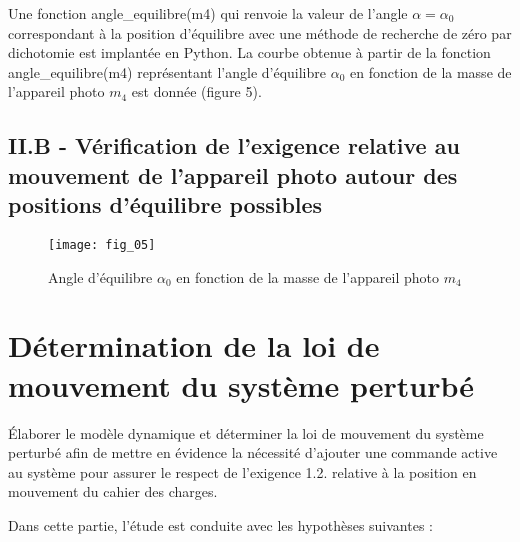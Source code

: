 Une fonction angle\_equilibre(m4) qui renvoie la valeur de l'angle $\alpha=\alpha_{0}$ correspondant à la position d'équilibre avec une méthode de recherche de zéro par dichotomie est implantée en Python. La courbe obtenue à partir de la fonction angle\_equilibre(m4) représentant l'angle d'équilibre $\alpha_{0}$ en fonction de la masse de l'appareil photo $m_{4}$ est donnée (figure 5).

\ifprof
\begin{corrige}
\end{corrige}
\else
\fi

\subsection{II.B - Vérification de l'exigence relative au mouvement de l'appareil photo autour des positions d'équilibre possibles}
\ifprof
\begin{corrige}
\end{corrige}
\else
\fi

\begin{figure}[H]
\centering
\texttt{[image: fig\_05]}
\caption{\label{fig:05} Angle d'équilibre $\alpha_{0}$ en fonction de la masse de l'appareil photo $m_{4}$}
\end{figure}



\section{\label{part:3}Détermination de la loi de mouvement du système perturbé }
\begin{obj}
Élaborer le modèle dynamique et déterminer la loi de mouvement du système perturbé afin de mettre en évidence la nécessité d'ajouter une commande active au système pour assurer le respect de l'exigence 1.2. relative à la position en mouvement du cahier des charges.
\end{obj}

Dans cette partie, l'étude est conduite avec les hypothèses suivantes :

